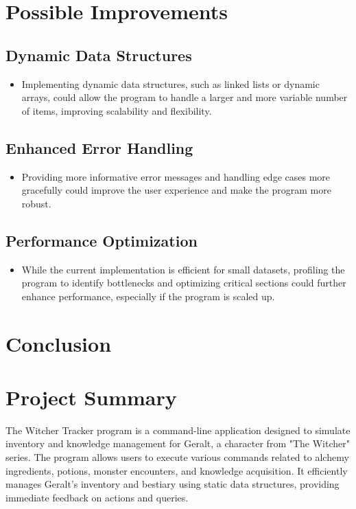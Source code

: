 \documentclass{article}
\begin{document}
\section*{Possible Improvements}

\subsection*{Dynamic Data Structures}
\begin{itemize}
    \item Implementing dynamic data structures, such as linked lists or dynamic arrays, could allow the program to handle a larger and more variable number of items, improving scalability and flexibility.
\end{itemize}

\subsection*{Enhanced Error Handling}
\begin{itemize}
    \item Providing more informative error messages and handling edge cases more gracefully could improve the user experience and make the program more robust.
\end{itemize}

\subsection*{Performance Optimization}
\begin{itemize}
    \item While the current implementation is efficient for small datasets, profiling the program to identify bottlenecks and optimizing critical sections could further enhance performance, especially if the program is scaled up.
\end{itemize}

\section{Conclusion}

\section*{Project Summary}

The Witcher Tracker program is a command-line application designed to simulate inventory and knowledge management for Geralt, a character from "The Witcher" series. The program allows users to execute various commands related to alchemy ingredients, potions, monster encounters, and knowledge acquisition. It efficiently manages Geralt's inventory and bestiary using static data structures, providing immediate feedback on actions and queries.
\end{document}
